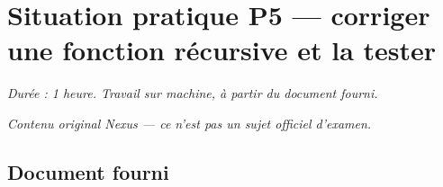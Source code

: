 %
\section*{Situation pratique P5 --- corriger une fonction récursive et la tester}

\textit{Durée : 1 heure. Travail sur machine, à partir du document fourni.}

\medskip
\textit{Contenu original Nexus --- ce n'est pas un sujet officiel d'examen.}

\subsection*{Document fourni}

